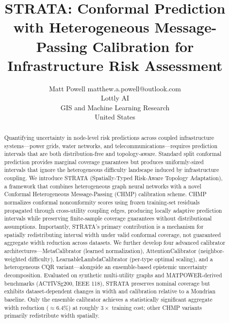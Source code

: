 \documentclass[twoside,11pt]{article}
\begin{document}
\title{STRATA: Conformal Prediction with Heterogeneous Message-Passing Calibration for Infrastructure Risk Assessment}

\author{\name Matt Powell \email matthew.a.powell@outlook.com \\
        \addr Lottly AI\\
        GIS and Machine Learning Research\\
        United States}


\maketitle

\begin{abstract}%
Quantifying uncertainty in node-level risk predictions across coupled infrastructure
systems---power grids, water networks, and telecommunications---requires
prediction intervals that are both distribution-free and topology-aware. Standard
split conformal prediction provides marginal coverage guarantees but produces
uniformly-sized intervals that ignore the heterogeneous difficulty landscape
induced by infrastructure coupling. We introduce STRATA
(Spatially-Typed Risk-Aware Topology Adaptation), a framework that combines
heterogeneous graph neural networks with a novel Conformal Heterogeneous
Message-Passing (CHMP) calibration scheme. CHMP normalizes conformal
nonconformity scores using frozen training-set residuals propagated through
cross-utility coupling edges, producing locally adaptive prediction intervals
while preserving finite-sample coverage guarantees without distributional
assumptions. Importantly, STRATA's primary contribution is a mechanism for
spatially redistributing interval width under valid conformal coverage, not
guaranteed aggregate width reduction across datasets. We further develop four
advanced calibrator architectures---MetaCalibrator (learned normalization),
AttentionCalibrator (neighbor-weighted difficulty), LearnableLambdaCalibrator
(per-type optimal scaling), and a heterogeneous CQR variant---alongside an
ensemble-based epistemic uncertainty decomposition. Evaluated on synthetic
multi-utility graphs and MATPOWER-derived benchmarks (ACTIVSg200, IEEE 118),
STRATA preserves nominal coverage but exhibits dataset-dependent changes in
width and calibration relative to a Mondrian baseline. Only the ensemble
calibrator achieves a statistically significant aggregate width reduction
($\approx$6.4\%) at roughly $3\times$ training cost; other CHMP variants
primarily redistribute width spatially.
\end{abstract}
\end{document}
